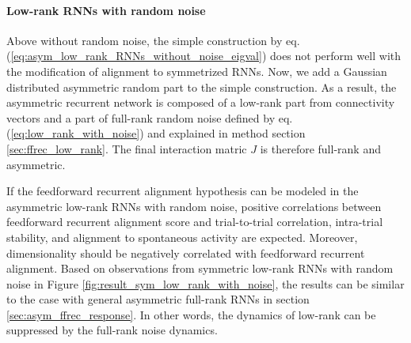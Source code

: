 \documentclass[11pt]{article}
\begin{document}
	\vspace{0.7cm}
	\paragraph{Low-rank RNNs with random noise}
	Above without random noise, the simple construction by eq.(\ref{eq:asym_low_rank_RNNs_without_noise_eigval}) does not perform well with the modification of alignment to symmetrized RNNs. Now, we add a Gaussian distributed asymmetric random part to the simple construction. As a result, the asymmetric recurrent network is composed of a low-rank part from connectivity vectors and a part of full-rank random noise defined by eq. (\ref{eq:low_rank_with_noise}) and explained in method section \ref{sec:ffrec_low_rank}. The final interaction matric $J$ is therefore full-rank and asymmetric. 
	
	If the feedforward recurrent alignment hypothesis can be modeled in the asymmetric low-rank RNNs with random noise, positive correlations between feedforward recurrent alignment score and trial-to-trial correlation, intra-trial stability, and alignment to spontaneous activity are expected. Moreover, dimensionality should be negatively correlated with feedforward recurrent alignment. Based on observations from symmetric low-rank RNNs with random noise in Figure \ref{fig:result_sym_low_rank_with_noise}, the results can be similar to the case with general asymmetric full-rank RNNs in section \ref{sec:asym_ffrec_response}. In other words, the dynamics of low-rank can be suppressed by the full-rank noise dynamics.  
	
\end{document}
